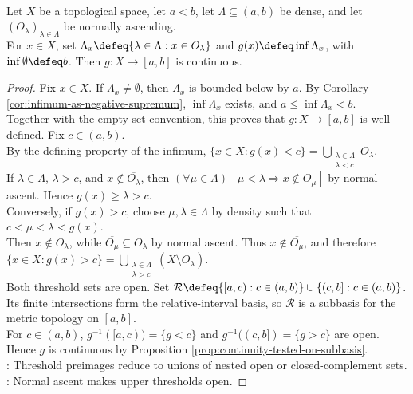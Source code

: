 \begin{lemma} \label{lem:normally-ascending-function-continuity} \\
Let $X$ be a topological space, let $a<b$, let $\Lambda\subseteq(a,b)$ be dense, and let $(O_\lambda)_{\lambda\in\Lambda}$ be normally ascending.\\
For $x\in X$, set $\Lambda_x\defeq\{\lambda\in\Lambda:x\in O_\lambda\}$ and $g(x)\defeq\inf\limits\Lambda_x$, with $\inf\limits\emptyset\defeq b$. Then $g:X\to[a,b]$ is continuous.
\begin{proof}
Fix $x\in X$. If $\Lambda_x\neq\emptyset$, then $\Lambda_x$ is bounded below by $a$. By Corollary \ref{cor:infimum-as-negative-supremum}, $\inf\limits\Lambda_x$ exists, and $a\leq\inf\limits\Lambda_x<b$.\\
Together with the empty-set convention, this proves that $g:X\to[a,b]$ is well-defined. Fix $c\in(a,b)$.\\
By the defining property of the infimum, $\{x\in X:g(x)<c\}=\bigcup\limits_{\substack{\lambda\in\Lambda\\ \lambda<c}}O_\lambda$.\\
If $\lambda\in\Lambda$, $\lambda>c$, and $x\notin\overline{O_\lambda}$, then $(\forall\mu\in\Lambda)\,[\mu<\lambda\Rightarrow x\notin O_\mu]$ by normal ascent. Hence $g(x)\geq\lambda>c$.\\
Conversely, if $g(x)>c$, choose $\mu,\lambda\in\Lambda$ by density such that $c<\mu<\lambda<g(x)$.\\
Then $x\notin O_\lambda$, while $\overline{O_\mu}\subseteq O_\lambda$ by normal ascent. Thus $x\notin\overline{O_\mu}$, and therefore $\{x\in X:g(x)>c\}=\bigcup\limits_{\substack{\lambda\in\Lambda\\ \lambda>c}}(X\setminus\overline{O_\lambda})$.\\
Both threshold sets are open. Set $\mathcal{R}\defeq\{[a,c):c\in(a,b)\}\cup\{(c,b]:c\in(a,b)\}$.\\
Its finite intersections form the relative-interval basis, so $\mathcal{R}$ is a subbasis for the metric topology on $[a,b]$.\\
For $c\in(a,b)$, $g^{-1}([a,c))=\{g<c\}$ and $g^{-1}((c,b])=\{g>c\}$ are open. Hence $g$ is continuous by Proposition \ref{prop:continuity-tested-on-subbasis}.\\
: Threshold preimages reduce to unions of nested open or closed-complement sets.\\
: Normal ascent makes upper thresholds open.
\end{proof}
\end{lemma}

